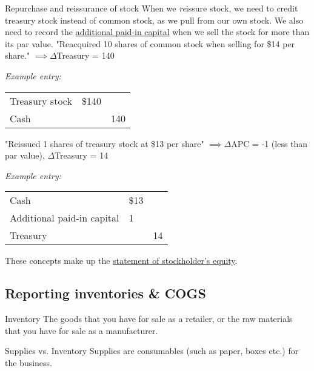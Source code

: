 \begin{theorem}
    {Repurchase and reissurance of stock}
    When we \textit{re}issure stock, we need to credit treasury stock instead of common stock, as we pull from our own stock. We also need to record the \hyperref[def:sale_of_stock]{additional paid-in capital} when we sell the stock for more than its par value.
    \tcblower
    "Reacquired 10 shares of common stock when selling for \$14 per share." $\implies \Delta$Treasury = 140

    \vspace{1em}

    \textit{Example entry:}
    \begin{tabular}{|lll|}
        \hline
        Treasury stock & \$140 &     \\
        \quad Cash     &       & 140 \\
        \hline
    \end{tabular}

    \vspace{2em}

    "Reissued 1 shares of treasury stock at \$13 per share" $\implies \Delta$APC = -1 (less than par value), $\Delta$Treasury = 14

    \vspace{1em}

    \textit{Example entry:}
    \begin{tabular}{|lll|}
        \hline
        Cash                       & \$13 &    \\
        Additional paid-in capital & 1    &    \\
        \quad Treasury             &      & 14 \\
        \hline
    \end{tabular}
\end{theorem}

These concepts make up the \hyperref[sec:statement_se]{statement of stockholder's equity}.

\subsection{Reporting inventories \& COGS}

\begin{definition}
    {Inventory}
    The goods that you have for sale as a retailer, or the raw materials that you have for sale as a manufacturer.
\end{definition}

\begin{knBox}
    {Supplies vs. Inventory}
    Supplies are consumables (such as paper, boxes etc.) for the business.
\end{knBox}

